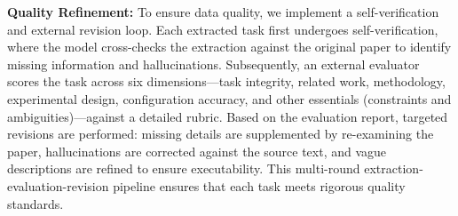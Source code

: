 \documentclass[letterpaper]{article} %
\begin{document}
\textbf{Quality Refinement:} To ensure data quality, we implement a self-verification and external revision loop. 
Each extracted task first undergoes self-verification, where the model cross-checks the extraction against the original paper 
to identify missing information and hallucinations. Subsequently, an external evaluator scores the task across six 
dimensions—task integrity, related work, methodology, experimental design, configuration accuracy, and other essentials 
(constraints and ambiguities)—against a detailed rubric. Based on the evaluation report, targeted revisions are performed: 
missing details are supplemented by re-examining the paper, hallucinations are corrected against the source text, and vague 
descriptions are refined to ensure executability. This multi-round extraction-evaluation-revision pipeline ensures that each 
task meets rigorous quality standards.
\end{document}
